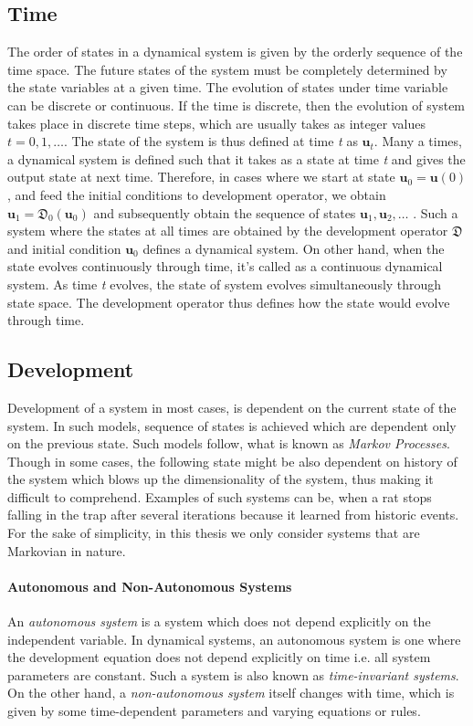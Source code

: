 \subsection{Time}
The order of states in a dynamical system is given by the orderly sequence of the time space. The future states of the system must be completely determined by the state variables at a given time.  The evolution of states under time variable can be discrete or continuous. If the time is discrete, then the evolution of system takes place in discrete time steps, which are usually takes as integer values $\textit{t}=0,1,\ldots$. The state of the system is thus defined at time \textit{t} as $\textbf{u}_{t}$. Many a times, a dynamical system is defined such that it takes as a state at time \textit{t} and gives the output state at next time. Therefore, in cases where we start at state $\textbf{u}_0=\textbf{u}(0)$, and feed the initial conditions to development operator, we obtain $\textbf{u}_1= \mathfrak{D}_0(\textbf{u}_0)$ and subsequently obtain the sequence of states $ \textbf{u}_{1},\textbf{u}_{2},\ldots $ . Such a system where the states at all times are obtained by the development operator $ \mathfrak{D} $ and initial condition $\textbf{u}_0$ defines a dynamical system. On other hand, when the state evolves continuously through time, it’s called as a continuous dynamical system. As time \textit{t} evolves, the state of system evolves simultaneously through state space. The development operator thus defines how the state would evolve through time.

\subsection{Development}
Development of a system in most cases, is dependent on the current state of the system. In such models, sequence of states is achieved which are dependent only on the previous state. Such models follow, what is known as \textit{Markov Processes}. Though in some cases, the following state might be also dependent on history of the system which blows up the dimensionality of the system, thus making it difficult to comprehend. Examples of such systems can be, when a rat stops falling in the trap after several iterations because it learned from historic events. For the sake of simplicity, in this thesis we only consider systems that are Markovian in nature.

\paragraph{Autonomous and Non-Autonomous Systems} An \textit{autonomous system} is a system which does not depend explicitly on the independent variable. In dynamical systems, an autonomous system is one where the development equation does not depend explicitly on time i.e. all system parameters are constant. Such a system is also known as \textit{time-invariant systems}. On the other hand, a \textit{non-autonomous system} itself changes with time, which is given by some time-dependent parameters and varying equations or rules.

